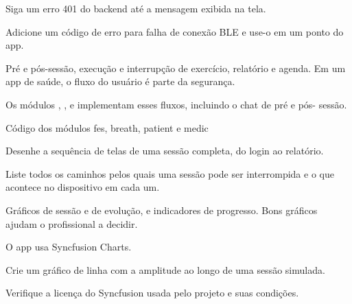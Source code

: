 \begin{pratique}
  \item Siga um erro 401 do backend até a mensagem exibida na tela.
  \item Adicione um código de erro para falha de conexão BLE e use-o em um ponto do app.
\end{pratique}

Pré e pós-sessão, execução e interrupção de exercício, relatório e agenda. Em um app de saúde, o fluxo do usuário é parte da segurança.

\begin{noproduto}
Os módulos , ,  e  implementam esses fluxos, incluindo o chat de pré e pós- sessão.
\end{noproduto}

\begin{paraestudar}
  \item Código dos módulos fes, breath, patient e medic
\end{paraestudar}

\begin{pratique}
  \item Desenhe a sequência de telas de uma sessão completa, do login ao relatório.
  \item Liste todos os caminhos pelos quais uma sessão pode ser interrompida e o que acontece no dispositivo em cada um.
\end{pratique}

Gráficos de sessão e de evolução, e indicadores de progresso. Bons gráficos ajudam o profissional a decidir.

\begin{noproduto}
O app usa Syncfusion Charts.
\end{noproduto}

\begin{paraestudar}
  \item {}
\end{paraestudar}

\begin{pratique}
  \item Crie um gráfico de linha com a amplitude ao longo de uma sessão simulada.
  \item Verifique a licença do Syncfusion usada pelo projeto e suas condições.
\end{pratique}

